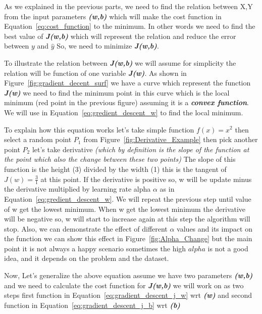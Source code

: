 As we explained in the previous parts, we need to find the relation between X,Y from the input parameters \textbf{\textit{(w,b)}} which will make the cost function in Equation~\eqref{eq:cost_function} to the minimum. In other words we need to find the best value of \textbf{\textit{J(w,b)}} which will represent the relation and reduce the error between $y$ and $\widehat{y}$  So, we need to minimize \textbf{\textit{J(w,b)}}. 



To illustrate the relation between \textbf{\textit{J(w,b)}} we will assume for simplicity the relation will be function of one variable \textbf{\textit{J(w)}}. As shown in Figure~\ref{fig:gradient_decent_surf} we have a curve which represent the function \textbf{\textit{J(w)}} we need to find the minimum point in this curve which is the local minimum (red point in the previous figure) assuming it is a  \textbf{\textit{convex function}}. We will use in Equation~\eqref{eq:gredient_descent_w} to find the local minimum.

To explain how this equation works let's take simple function $f(x) = x^2$ then select a random point $P_1$ from Figure~\ref{fig:Derivative_Example} then pick another point $P_2$ let's take derivative \textit{(which by definition is the slope of the function at the point which also the change between these two points)} The slope of this function is the height (3) divided by the width (1) this is the tangent of $J(w)=\frac{3}{1}$ at this point. If the derivative is positive so, w will be update minus the derivative multiplied by learning rate alpha $\alpha$ as in Equation~\eqref{eq:gredient_descent_w}. We will repeat the previous step until value of w get the lowest minimum. When w get the lowest minimum the derivative will be negative so, w will start to increase again at this step the algorithm will stop. Also, we can demonstrate the effect of different $\alpha$ values and its impact on the function we can show this effect in Figure~\ref{fig:Alpha_Change} but the main point it is not always a happy scenario sometimes the high $alpha$ is not a good idea, and it depends on the problem and the dataset.

Now, Let's generalize the above equation assume we have two parameters  \textbf{\textit{(w,b)}} and we need to calculate the cost function for  \textbf{\textit{J(w,b)}} we will work on as two steps first function in Equation~\eqref{eq:gradient_descent_j_w}  wrt \textbf{\textit{(w)}} and second function in Equation~\eqref{eq:gradient_descent_j_b} wrt \textbf{\textit{(b)}}

